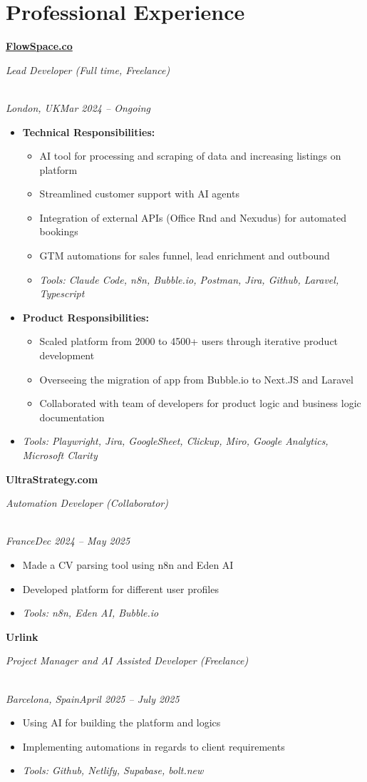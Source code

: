 \documentclass[a4paper,10pt]{article}
\newcommand{\role}[4]{\vspace{3pt}\noindent\hspace{0.6em}\parbox[t]{0.38\textwidth}{\raggedright\textbf{#1}}\hfill\parbox[t]{0.58\textwidth}{\raggedleft\textit{#2}}\\{\textit{#3}\hfill\textit{#4}}\vspace{1pt}}
\begin{document}
\section{Professional Experience}
\role{\href{https://flowspace.co}{FlowSpace.co}}{Lead Developer (Full time, Freelance)}{London, UK}{Mar 2024 -- Ongoing}
\begin{itemize}
\item \textbf{Technical Responsibilities:}
\begin{itemize}[label=--]
\item AI tool for processing and scraping of data and increasing listings on platform
\item Streamlined customer support with AI agents
\item Integration of external APIs (Office Rnd and Nexudus) for automated bookings
\item GTM automations for sales funnel, lead enrichment and outbound
\item \textit{Tools: Claude Code, n8n, Bubble.io, Postman, Jira, Github, Laravel, Typescript}
\end{itemize}
\item \textbf{Product Responsibilities:}
\begin{itemize}[label=--]
\item Scaled platform from 2000 to 4500+ users through iterative product development
\item Overseeing the migration of app from Bubble.io to Next.JS and Laravel
\item Collaborated with team of developers for product logic and business logic documentation
\end{itemize}
\item \textit{Tools: Playwright, Jira, GoogleSheet, Clickup, Miro, Google Analytics, Microsoft Clarity}
\end{itemize}

\role{UltraStrategy.com}{Automation Developer (Collaborator)}{France}{Dec 2024 -- May 2025}
\begin{itemize}
\item Made a CV parsing tool using n8n and Eden AI
\item Developed platform for different user profiles
\item \textit{Tools: n8n, Eden AI, Bubble.io}
\end{itemize}

\role{Urlink}{Project Manager and AI Assisted Developer (Freelance)}{Barcelona, Spain}{April 2025 -- July 2025}
\begin{itemize}
\item Using AI for building the platform and logics
\item Implementing automations in regards to client requirements
\item \textit{Tools: Github, Netlify, Supabase, bolt.new}
\end{itemize}
\end{document}
